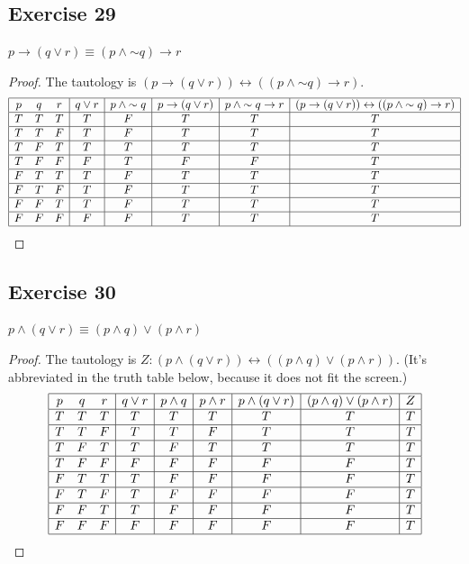 \documentclass[14pt]{extarticle}
\newcommand{\bic}{\leftrightarrow}
\begin{document}
\subsection{Exercise 29} 
$p \to (q \vee r) \equiv (p \wedge {\sim q}) \to r$
\begin{proof} The tautology is $(p \to (q \vee r)) \bic ((p \wedge {\sim q}) \to
r)$. $$ \begin{array}{|ccc|c|c|c|c|c|c|} \hline p & q & r & q \vee r & p \wedge
{\sim q} & p \to (q \vee r) & p \wedge {\sim q} \to r & (p \to (q \vee r)) \bic
((p \wedge {\sim q}) \to r) \\ \hline T & T & T & T & F & T & T & T \\ \hline T
& T & F & T & F & T & T & T \\ \hline T & F & T & T & T & T & T & T \\ \hline T
& F & F & F & T & F & F & T \\ \hline F & T & T & T & F & T & T & T \\ \hline F
& T & F & T & F & T & T & T \\ \hline F & F & T & T & F & T & T & T \\ \hline F
& F & F & F & F & T & T & T \\ \hline \end{array} $$ \end{proof}

\subsection{Exercise 30} 
$p \wedge (q \vee r) \equiv (p \wedge q) \vee (p \wedge r)$

\begin{proof} 
The tautology is $Z: (p \wedge (q \vee r)) \bic ((p \wedge q) \vee
(p \wedge r))$. (It's abbreviated in the truth table below, because it does not
fit the screen.) 
$$ 
\begin{array}{|ccc|c|c|c|c|c|c|} 
\hline 
p & q & r & q \vee r & p \wedge q & p \wedge r & p \wedge (q \vee r) & (p \wedge q) \vee (p \wedge r) & Z \\ 
\hline 
T & T & T & T & T & T & T & T & T \\ 
\hline 
T & T & F & T & T & F & T & T & T \\ 
\hline 
T & F & T & T & F & T & T & T & T \\ 
\hline 
T & F & F & F & F & F & F & F & T \\ 
\hline 
F & T & T & T & F & F & F & F & T \\ 
\hline 
F & T & F & T & F & F & F & F & T \\ 
\hline 
F & F & T & T & F & F & F & F & T \\
\hline 
F & F & F & F & F & F & F & F & T \\ 
\hline 
\end{array} 
$$ 
\end{proof}
\end{document}
